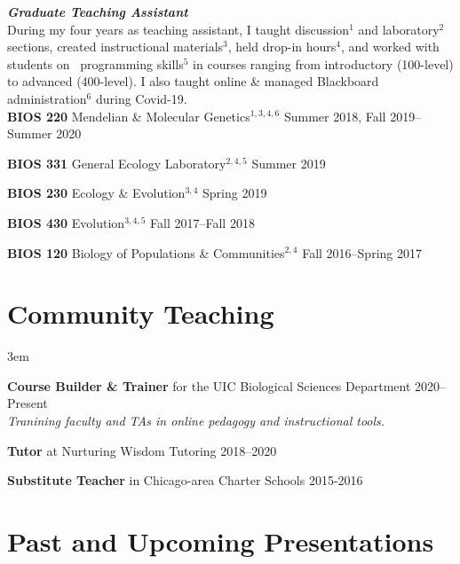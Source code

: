 \documentclass[]{article}
\begin{document}
\textit{\textbf{Graduate Teaching Assistant}}\\
During my four years as teaching assistant, I taught discussion$^{1}$ and laboratory$^{2}$ sections, created instructional materials$^{3}$, held drop-in hours$^{4}$, and worked with students on \textcolor{light-gray}{\faRProject}\ programming skills$^{5}$ in courses ranging from introductory (100-level) to advanced (400-level). I also taught online \& managed Blackboard administration$^{6}$ during Covid-19.\\

\textbf{BIOS 220} Mendelian \& Molecular Genetics$^{1, 3, 4, 6}$ \href{https://ledelaney.org/teaching/genetics220/}{\faLink} \href{https://github.com/ledelaney/Genetics220}{\faGithub}
 \hfill Summer 2018, Fall 2019--Summer 2020


\textbf{BIOS 331} General Ecology Laboratory$^{2, 4, 5}$ \href{https://github.com/ledelaney/GeneralEcologyMaterials}{\faGithub} \hfill Summer 2019

     
\textbf{BIOS 230} Ecology \& Evolution$^{3, 4}$ \hfill Spring 2019
     
\textbf{BIOS 430} Evolution$^{3, 4, 5}$ \hfill Fall 2017--Fall 2018

\textbf{BIOS 120} Biology of Populations \& Communities$^{2, 4}$ \hfill Fall 2016--Spring 2017


\clearpage
\pagestyle{alldocument}

\section{Community Teaching}
\vspace{3mm}
\leftskip 3em

\textbf{Course Builder \& Trainer} for the UIC Biological Sciences Department \href{https://www.ledelaney.org/cb-materials}{\faLink} \href{https://github.com/ledelaney/cb-materials}{\faGithub} \hfill 2020--Present\\
\textit{Tranining faculty and TAs in online pedagogy and instructional tools.}
     
\textbf{Tutor} at Nurturing Wisdom Tutoring \hfill 2018--2020

\textbf{Substitute Teacher} in Chicago-area Charter Schools \hfill 2015-2016

\vspace{2mm}
\section{Past and Upcoming Presentations}
\end{document}
